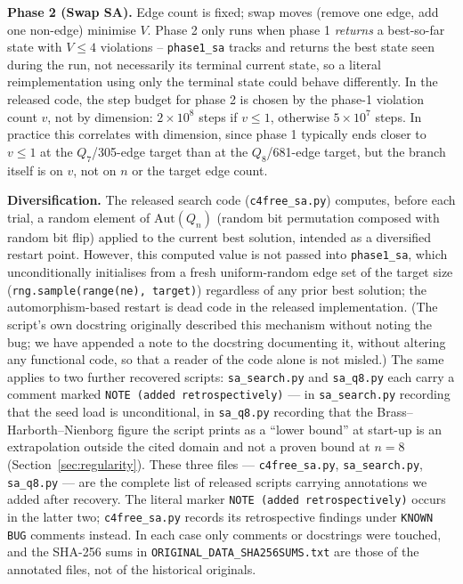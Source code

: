 \documentclass[12pt,a4paper]{article}
\theoremstyle{definition}
\begin{document}
\noindent\textbf{Phase 2 (Swap SA).}
Edge count is fixed; swap moves (remove one edge, add one non-edge)
minimise $V$. Phase 2 only runs when phase 1 \emph{returns} a
best-so-far state with $V\le4$ violations -- \texttt{phase1\_sa} tracks
and returns the best state seen during the run, not necessarily its
terminal current state, so a literal reimplementation using only the
terminal state could behave differently. In the released code, the
step budget for phase 2 is chosen by the phase-1 violation count $v$,
not by dimension: $2\times10^8$ steps if $v\le1$, otherwise
$5\times10^7$ steps. In practice this correlates with dimension, since
phase 1 typically ends closer to $v\le1$ at the $Q_7$/305-edge target
than at the $Q_8$/681-edge target, but the branch itself is on $v$, not
on $n$ or the target edge count.

\noindent\textbf{Diversification.} The released search code
(\texttt{c4free\_sa.py}) computes, before each trial, a random element of
$\mathrm{Aut}(Q_n)$ (random bit permutation composed with random bit
flip) applied to the current best solution, intended as a diversified
restart point. However, this computed value is not passed into
\texttt{phase1\_sa}, which unconditionally initialises from a fresh
uniform-random edge set of the target size
(\texttt{rng.sample(range(ne), target)}) regardless of any prior best
solution; the automorphism-based restart is dead code in the released
implementation. (The script's own docstring originally described this
mechanism without noting the bug; we have appended a note to the
docstring documenting it, without altering any functional code, so
that a reader of the code alone is not misled.) The same applies to two
further recovered scripts: \texttt{sa\_search.py} and \texttt{sa\_q8.py}
each carry a comment marked \texttt{NOTE (added retrospectively)} --- in
\texttt{sa\_search.py} recording that the seed load is unconditional, in
\texttt{sa\_q8.py} recording that the Brass--Harborth--Nienborg figure the
script prints as a ``lower bound'' at start-up is an extrapolation outside
the cited domain and not a proven bound at $n=8$
(Section~\ref{sec:regularity}). These three files ---
\texttt{c4free\_sa.py}, \texttt{sa\_search.py}, \texttt{sa\_q8.py} --- are the
complete list of released scripts carrying annotations we added after
recovery. The literal marker \texttt{NOTE (added retrospectively)} occurs in
the latter two; \texttt{c4free\_sa.py} records its retrospective findings
under \texttt{KNOWN BUG} comments instead. In each case only comments or
docstrings were touched, and the
SHA-256 sums in \texttt{ORIGINAL\_DATA\_SHA256SUMS.txt} are those of the
annotated files, not of the historical originals.
\end{document}
